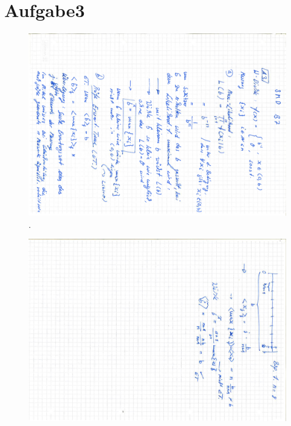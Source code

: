 \section{Aufgabe3}
\label{a3}

\begin{figure}
  \centering
  \includegraphics[width=\textwidth]{pictures/bild31.pdf}
  \caption{.}
  \label{fig:bild31}
\end{figure}

\begin{figure}
  \centering
  \includegraphics[width=\textwidth]{pictures/bild32.pdf}
  \caption{}
  \label{}
\end{figure}
